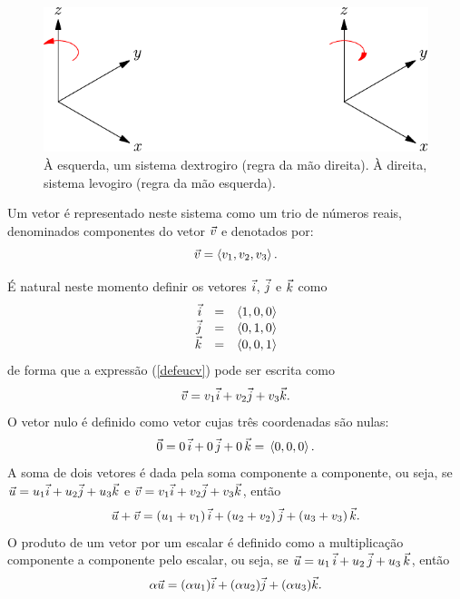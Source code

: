 \begin{figure}\begin{center}
 \includegraphics{./cap_algvet/pics/eixos_levo_destro}
      \caption{À esquerda, um sistema dextrogiro (regra da mão direita). À direita, sistema levogiro (regra da mão esquerda).}
      \label{fig:marginfig}
  \end{center}
  \end{figure}
 
 Um vetor é representado neste sistema como um trio de números reais, denominados componentes do vetor $\vec{v}$ e denotados por: 
\begin{equation}\label{defeucv}\vec{v}=\left<v_1,v_2,v_3\right>.\end{equation}
  
É natural neste momento definir os vetores $\vec{i}$, $\vec{j}$ e $\vec{k}$ como
\begin{equation}\label{defijk}
\begin{array}{rcl}
\vec{i}&=&\left<1,0,0\right>\\
\vec{j}&=&\left<0,1,0\right>\\
\vec{k}&=&\left<0,0,1\right>
\end{array}
\end{equation}
de forma que a expressão (\ref{defeucv}) pode ser escrita como
\begin{equation}\label{repijk}\vec{v}=v_1  \vec{i}+v_2  \vec{j}+v_3 \vec{k}.\end{equation}
O vetor nulo é definido como vetor cujas três coordenadas são nulas:
\begin{equation}\label{defnulo}\vec{0}=0 ~\! \vec{i}+0~\!  \vec{j}+0~\!  \vec{k}= ~\!\left<0,0,0\right>.\end{equation}
A soma de dois vetores é dada pela soma componente a componente, ou seja, se $\vec{u}=u_1  \vec{i}+u_2\vec{j}+u_3 \vec{k}$ e $\vec{v}=v_1\vec{i}+v_2\vec{j}+v_3 \vec{k}$, então
\begin{equation}\label{defsoma}\vec{u}+\vec{v}= \left(u_1+v_1\right) \vec{i}+\left(u_2+v_2\right) \vec{j}+\left(u_3+v_3\right) \vec{k}.\end{equation}
O produto de um vetor por um escalar é definido como a multiplicação componente a componente pelo escalar, ou seja, se $\vec{u}=u_1~\!  \vec{i}+u_2~\!  \vec{j}+u_3 ~\! \vec{k}$, então
\begin{equation}\label{defprod}\alpha\vec{u}=(\alpha u_1)\vec{i}+(\alpha u_2)\vec{j}+(\alpha u_3) \vec{k} .\end{equation}

